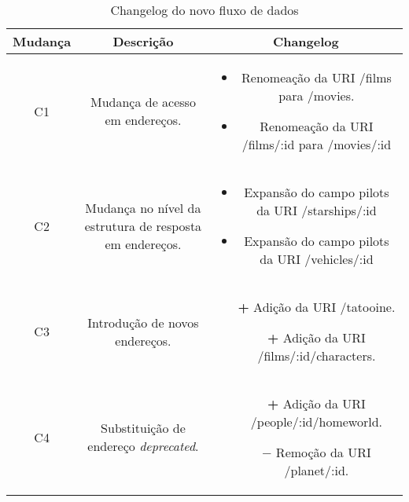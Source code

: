 \begin{table}[H]
  \centering
  \begin{tabular}{|c|c|c|}
    \hline
    Mudança & Descrição & Changelog \\
    \hline
    C1 & \begin{minipage}[t]{0.3\textwidth}
      Mudança de acesso em endereços.
    \end{minipage} & \begin{minipage}[t]{0.5\textwidth}
      \begin{itemize}
        \item Renomeação da URI /films para /movies.
        \item Renomeação da URI /films/:id para /movies/:id
      \end{itemize}
    \end{minipage} \\
    \hline
    C2 & \begin{minipage}[t]{0.3\textwidth}
      Mudança no nível da estrutura de resposta em endereços.
    \end{minipage} & \begin{minipage}[t]{0.5\textwidth}
      \begin{itemize}
        \item Expansão do campo pilots da URI /starships/:id
        \item Expansão do campo pilots da URI /vehicles/:id
      \end{itemize}
    \end{minipage} \\
    \hline
    C3 & \begin{minipage}[t]{0.3\textwidth}
      Introdução de novos endereços.
    \end{minipage} & \begin{minipage}[t]{0.5\textwidth}
      \begin{itemize}
        \item[\textbf{+}] Adição da URI /tatooine.
        \item[\textbf{+}] Adição da URI /films/:id/characters.
      \end{itemize}
    \end{minipage} \\
    \hline
    C4 & \begin{minipage}[t]{0.3\textwidth}
      Substituição de endereço \textit{deprecated}.
    \end{minipage} & \begin{minipage}[t]{0.5\textwidth}
      \begin{itemize}
        \item[\textbf{+}] Adição da URI /people/:id/homeworld.
        \item[\textbf{$-$}] Remoção da URI /planet/:id.
      \end{itemize}
    \end{minipage} \\
    \hline
  \end{tabular}
  \caption{Changelog do novo fluxo de dados}
\end{table}

